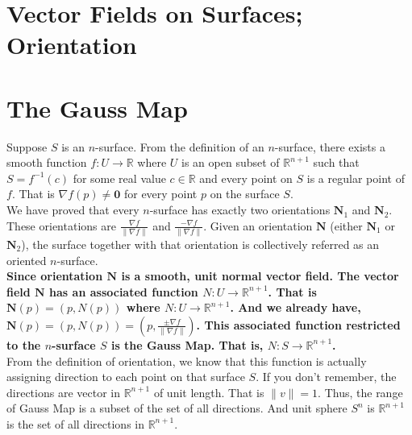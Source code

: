 \section{Vector Fields on Surfaces; Orientation}

\section{The Gauss Map}
	Suppose $S$ is an $n$-surface.
	From the definition of an $n$-surface, there exists a smooth function $f : U \to \mathbb{R}$ where $U$ is an open subset of $\mathbb{R}^{n+1}$ such that $S = f^{-1}(c)$ for some real value $c \in \mathbb{R}$ and every point on $S$ is a regular point of $f$.
	That is $\nabla f(p) \ne \mathbf{0}$ for every point $p$ on the surface $S$.\\


	We have proved that every $n$-surface has exactly two orientations $\mathbf{N}_1$ and $\mathbf{N}_2$.
	These orientations are $\frac{\nabla f}{\| \nabla f\|}$ and $\frac{-\nabla f}{\| \nabla f\|}$.
	Given an orientation $\mathbf{N}$ (either $\mathbf{N}_1$ or $\mathbf{N}_2$), the surface together with that orientation is collectively referred as an oriented $n$-surface.\\

	\textbf{Since orientation $\mathbf{N}$ is a smooth, unit normal vector field.
	The vector field $\mathbf{N}$ has an associated function $N : U \to \mathbb{R}^{n+1}$.
	That is $\mathbf{N}(p) = (p,N(p))$ where $N : U \to \mathbb{R}^{n+1}$.
	And we already have, $\mathbf{N}(p) = (p,N(p)) = (p, \frac{\pm \nabla f}{\| \nabla f\|})$.
	This associated function restricted to the $n$-surface $S$ is the \textbf{Gauss Map}.
	That is, $N : S \to \mathbb{R}^{n+1}$.}\\

	From the definition of orientation, we know that this function is actually assigning direction to each point on that surface $S$.
	If you don't remember, the directions are vector in $\mathbb{R}^{n+1}$ of unit length.
	That is $\|v\| = 1$.
	Thus, the range of Gauss Map is a subset of the set of all directions.
	And unit sphere $S^n$ is $\mathbb{R}^{n+1}$ is the set of all directions in $\mathbb{R}^{n+1}$.\\

